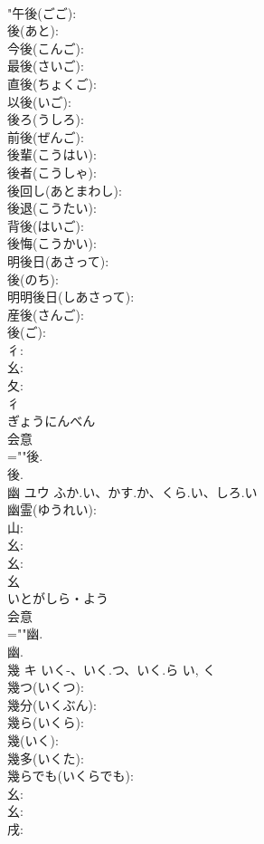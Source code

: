\documentclass[8pt]{extreport}
\begin{document}
\begin{CJK}{UTF8}{min}
\\	"午後(ごご): 
\\	後(あと): 
\\	今後(こんご): 
\\	最後(さいご): 
\\	直後(ちょくご): 
\\	以後(いご): 
\\	後ろ(うしろ): 
\\	前後(ぜんご): 
\\	後輩(こうはい): 
\\	後者(こうしゃ): 
\\	後回し(あとまわし): 
\\	後退(こうたい): 
\\	背後(はいご): 
\\	後悔(こうかい): 
\\	明後日(あさって): 
\\	後(のち): 
\\	明明後日(しあさって): 
\\	産後(さんご): 
\\	後(ご): 
\\	彳: 
\\	幺: 
\\	夂: 
\\	彳	
\\	ぎょうにんべん	
\\	会意 
\\	=""後.
\\	後.
\\	幽	ユウ	ふか.い、かす.か、くら.い、しろ.い		
\\	幽霊(ゆうれい): 
\\	山: 
\\	幺: 
\\	幺: 
\\	幺	
\\	いとがしら・よう	
\\	会意 
\\	=""幽.
\\	幽.
\\	幾	キ	いく-、いく.つ、いく.ら	い, く	
\\	幾つ(いくつ): 
\\	幾分(いくぶん): 
\\	幾ら(いくら): 
\\	幾(いく): 
\\	幾多(いくた): 
\\	幾らでも(いくらでも): 
\\	幺: 
\\	幺: 
\\	戌: 

\end{CJK}
\end{document}
